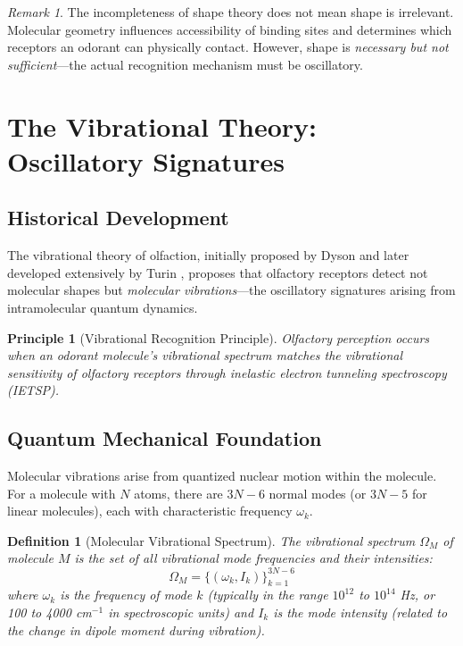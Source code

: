 \documentclass[11pt]{article}
\newtheorem{definition}[theorem]{Definition}
\newtheorem{principle}[theorem]{Principle}
\theoremstyle{remark}
\newtheorem{remark}[theorem]{Remark}
\begin{document}
\begin{remark}
The incompleteness of shape theory does not mean shape is irrelevant. Molecular geometry influences accessibility of binding sites and determines which receptors an odorant can physically contact. However, shape is \textit{necessary but not sufficient}—the actual recognition mechanism must be oscillatory.
\end{remark}

\section{The Vibrational Theory: Oscillatory Signatures}

\subsection{Historical Development}

The vibrational theory of olfaction, initially proposed by Dyson \cite{dyson1938scientific} and later developed extensively by Turin \cite{turin1996spectroscopic,turin2002mechanism}, proposes that olfactory receptors detect not molecular shapes but \textit{molecular vibrations}—the oscillatory signatures arising from intramolecular quantum dynamics.

\begin{principle}[Vibrational Recognition Principle]
\label{prin:vibrational_recognition}
Olfactory perception occurs when an odorant molecule's vibrational spectrum matches the vibrational sensitivity of olfactory receptors through inelastic electron tunneling spectroscopy (IETSP).
\end{principle}

\subsection{Quantum Mechanical Foundation}

Molecular vibrations arise from quantized nuclear motion within the molecule. For a molecule with $N$ atoms, there are $3N - 6$ normal modes (or $3N - 5$ for linear molecules), each with characteristic frequency $\omega_k$.

\begin{definition}[Molecular Vibrational Spectrum]
\label{def:vibrational_spectrum}
The vibrational spectrum $\Omega_M$ of molecule $M$ is the set of all vibrational mode frequencies and their intensities:
\begin{equation}
\Omega_M = \{(\omega_k, I_k)\}_{k=1}^{3N-6}
\end{equation}
where $\omega_k$ is the frequency of mode $k$ (typically in the range $10^{12}$ to $10^{14}$ Hz, or 100 to 4000 cm$^{-1}$ in spectroscopic units) and $I_k$ is the mode intensity (related to the change in dipole moment during vibration).
\end{definition}
\end{document}

